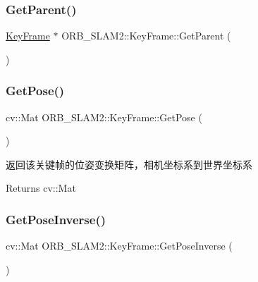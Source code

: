 \subsubsection{\texorpdfstring{Get\+Parent()}{GetParent()}}
{\footnotesize\ttfamily \mbox{\hyperlink{class_o_r_b___s_l_a_m2_1_1_key_frame}{Key\+Frame}} $\ast$ O\+R\+B\+\_\+\+S\+L\+A\+M2\+::\+Key\+Frame\+::\+Get\+Parent (\begin{DoxyParamCaption}{ }\end{DoxyParamCaption})}

\mbox{\label{class_o_r_b___s_l_a_m2_1_1_key_frame_a49b5e212c1335cf585eaf6bbc4fed85c}} 
\subsubsection{\texorpdfstring{Get\+Pose()}{GetPose()}}
{\footnotesize\ttfamily cv\+::\+Mat O\+R\+B\+\_\+\+S\+L\+A\+M2\+::\+Key\+Frame\+::\+Get\+Pose (\begin{DoxyParamCaption}{ }\end{DoxyParamCaption})}



返回该关键帧的位姿变换矩阵，相机坐标系到世界坐标系 

\begin{DoxyReturn}{Returns}
cv\+::\+Mat 
\end{DoxyReturn}
\mbox{\label{class_o_r_b___s_l_a_m2_1_1_key_frame_a03be061f5dac65d360d65c6e8a63532f}} 
\subsubsection{\texorpdfstring{Get\+Pose\+Inverse()}{GetPoseInverse()}}
{\footnotesize\ttfamily cv\+::\+Mat O\+R\+B\+\_\+\+S\+L\+A\+M2\+::\+Key\+Frame\+::\+Get\+Pose\+Inverse (\begin{DoxyParamCaption}{ }\end{DoxyParamCaption})}




